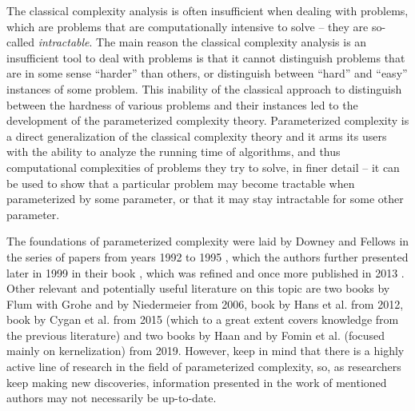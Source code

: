 The classical complexity analysis is often insufficient when dealing with \NPh problems,
which are problems that are computationally intensive to solve --
they are so-called \emph{intractable}.
The main reason the classical complexity analysis is an insufficient tool to deal with \NPh problems is that
it cannot distinguish \NPh problems that are in some sense ``harder'' than others,
or distinguish between ``hard'' and ``easy'' instances of some \NPh problem.
This inability of the classical approach to distinguish between the hardness of various \NPh problems and their instances
led to the development of the parameterized complexity theory.
Parameterized complexity is a direct generalization of the classical complexity theory and it arms its users
with the ability to analyze the running time of algorithms, and thus computational complexities of problems
they try to solve, in finer detail --
it can be used to show that a particular problem may become tractable when parameterized by some parameter,
or that it may stay intractable for some other parameter.

The foundations of parameterized complexity were laid by Downey and Fellows
in the series of papers from years 1992 to 1995 \cite{Downey1995.1,Downey1995.2,Downey1993,Downey1995.4},
which the authors further presented later in 1999 in their book \cite{Downey1999},
which was refined and once more published in 2013 \cite{Downey2013}.
Other relevant and potentially useful literature on this topic are
two books by Flum with Grohe \cite{Flum2006} and by Niedermeier \cite{Niedermeier2006} from 2006, book by Hans et al. \cite{Hans2012} from 2012,
book by Cygan et al. \cite{Cygan2015} from 2015 (which to a great extent covers knowledge from the previous literature)
and two books by Haan \cite{Haan2019} and by Fomin et al. (focused mainly on kernelization) \cite{Fomin2019} from 2019.
However, keep in mind that there is a highly active line of research in the field of parameterized complexity, so,
as researchers keep making new discoveries, information presented in the work of mentioned authors may not necessarily be up-to-date.
